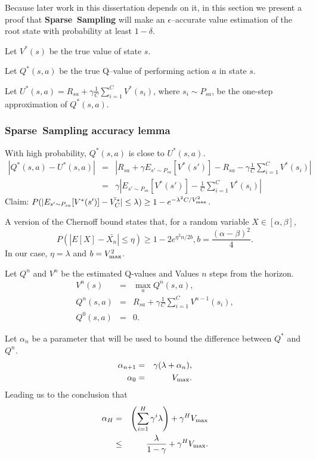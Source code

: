 Because later work in this dissertation depends on it, in this section we present a proof that {\bf Sparse~Sampling} will make an $\epsilon$--accurate value estimation of the root state with probability at least $1-\delta$.

Let $V^*(s)$ be the true value of state $s$.

Let $Q^*(s,a)$ be the true Q--value of performing action $a$ in state $s$.

Let $U^*(s,a) = R_{sa}+\gamma\frac 1 C \sum_{i=1}^C V^*(s_i)$, where $s_i\sim P_{sa}$, be the one-step approximation of $Q^*(s,a)$.

\subsubsection{{\bf Sparse~Sampling} accuracy lemma} With high probability, $Q^*(s,a)$ is close to $U^*(s,a)$.
\begin{eqnarray}
|Q^*(s,a)-U^*(s,a)| &=& |R_{sa}+\gamma E_{s'\sim P_{sa}}[V^*(s')] - R_{sa} - \gamma \frac 1 C \sum_{i=1}^C V^*(s_i)|\\
&=& \gamma |E_{s'\sim P_{sa}}[V^*(s')] - \frac 1 C \sum_{i=1}^C V^*(s_i)|
\end{eqnarray}
Claim: $P(|E_{s'\sim P_{sa}}[V^*(s')] - \bar{V^*_C}| \leq \lambda) \geq 1-e^{-\lambda^2 C / {V_{\rm max}^2}}$.

A version of the Chernoff bound states that, for a random variable $X\in[\alpha,\beta]$,
$$P(|E[X] - \bar{X_n}| \leq \eta) \geq 1-2e^{\eta^2 n / 2 b}, b=\frac{(\alpha-\beta)^2}4.$$
In our case, $\eta=\lambda$ and $b=V_{\rm max}^2$.

Let $Q^n$ and $V^n$ be the estimated Q-values and Values $n$ steps from the horizon.
\begin{eqnarray}
V^n(s) &=& \max_a Q^n(s,a),\\
Q^n(s,a)&=&R_{sa}+\gamma \frac 1 C \sum_{i=1}^C V^{n-1}(s_i),\\
Q^0(s,a)&=&0.
\end{eqnarray}

Let $\alpha_n$ be a parameter that will be used to bound the difference between $Q^*$ and $Q^n$.
\begin{eqnarray}
\alpha_{n+1}&=&\gamma(\lambda + \alpha_n),\\
\alpha_0&=&V_{\rm max}.
\end{eqnarray}
Leading us to the conclusion that
\begin{eqnarray}
\alpha_H &=& \left(\sum_{i=1}^H \gamma^i \lambda\right)+\gamma^HV_{\rm max}\\
 &\leq& \frac \lambda {1-\gamma}+\gamma^HV_{\rm max}.
\end{eqnarray}

